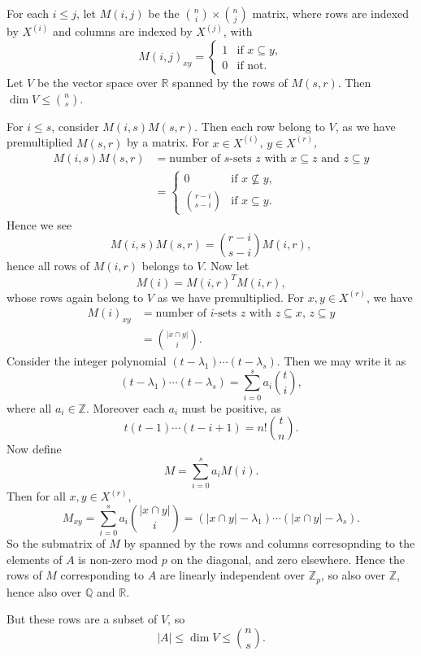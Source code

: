 \documentclass[12pt]{article}
\begin{document}
\begin{proofbox}
	For each $i \leq j$, let $M(i, j)$ be the $\binom ni \times \binom nj$ matrix, where rows are indexed by $X^{(i)}$ and columns are indexed by $X^{(j)}$, with
	\[
	M(i, j)_{xy} =
	\begin{cases}
		1 & \text{if } x \subseteq y, \\
		0 & \text{if not}.
	\end{cases}
	\]
	Let $V$ be the vector space over $\mathbb{R}$ spanned by the rows of $M(s, r)$. Then $\dim V \leq \binom ns$.

	For $i \leq s$, consider $M(i, s) M(s, r)$. Then each row belong to $V$, as we have premultiplied $M(s, r)$ by a matrix. For $x \in X^{(i)}$, $y \in X^{(r)}$,
	\begin{align*}
		M(i, s) M(s, r) &= \text{number of $s$-sets $z$ with $x \subseteq z$ and $z \subseteq y$} \\
				&=
				\begin{cases}
					0 & \text{if } x \not \subseteq y, \\
					\binom{r-i}{s-i} & \text{if } x \subseteq y.
				\end{cases}
	\end{align*}
	Hence we see
	\[
		M(i, s) M(s, r) = \binom{r-i}{s-i} M(i, r),
	\]
	hence all rows of $M(i, r)$ belongs to $V$. Now let
	\[
	M(i) = M(i, r)^{T} M(i, r),
	\]
	whose rows again belong to $V$ as we have premultiplied. For $x, y \in X^{(r)}$, we have
	\begin{align*}
		M(i)_{xy} &= \text{number of $i$-sets $z$ with $z \subseteq x$, $z \subseteq y$} \\
			  &= \binom{|x \cap y|}{i}.
	\end{align*}
	Consider the integer polynomial $(t - \lambda_1)\cdots (t - \lambda_s)$. Then we may write it as
	\[
		(t-  \lambda_1) \cdots (t - \lambda_s) = \sum_{i = 0}^s a_i \binom ti,
	\]
	where all $a_i \in \mathbb{Z}$. Moreover each $a_i$ must be positive, as
	\[
	t(t - 1) \cdots (t - i + 1) = n! \binom tn.
	\] 
	Now define
	\[
	M = \sum_{i = 0}^s a_i M(i).
	\]
	Then for all $x, y \in X^{(r)}$,
	\[
		M_{xy} = \sum_{i = 0}^s a_i \binom{|x \cap y|}i = (|x \cap y| - \lambda_1) \cdots (|x \cap y| - \lambda_s).
	\]
	So the submatrix of $M$ by spanned by the rows and columns corresopnding to the elements of $A$ is non-zero mod $p$ on the diagonal, and zero elsewhere. Hence the rows of $M$ corresponding to $A$ are linearly independent over $\mathbb{Z}_p$, so also over $\mathbb{Z}$, hence also over $\mathbb{Q}$ and $\mathbb{R}$.

	But these rows are a subset of $V$, so
	\[
	|A| \leq \dim V \leq \binom ns.
	\]
\end{proofbox}
\end{document}
